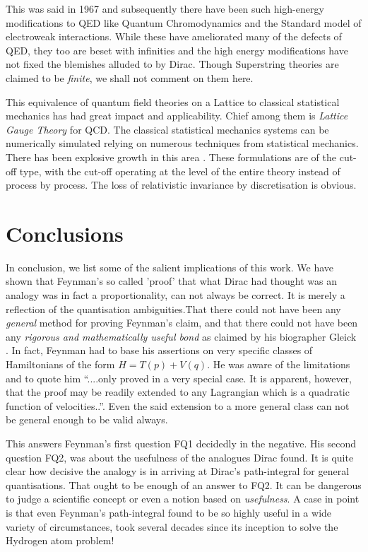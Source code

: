 \documentclass[12pt]{article}
\begin{document}
This was said in 1967 and subsequently there have been such high-energy modifications to QED like Quantum Chromodynamics and the Standard
model of electroweak interactions. While these have ameliorated many of the defects of QED, they too are beset with infinities and the
high energy modifications have not fixed the blemishes alluded to by Dirac. Though Superstring theories are claimed to be {\it finite}, we
shall not comment on them here.

This equivalence of quantum field theories on a Lattice to classical statistical mechanics has had great impact and applicability. Chief 
among them is
{\it Lattice Gauge Theory} \cite{seiler} for QCD. The classical statistical mechanics systems can be numerically simulated relying on numerous techniques
from statistical mechanics. There has been explosive growth in this area \cite{creutz}. These formulations are of the cut-off type, with
the cut-off operating at the level of the entire theory instead of process by process. The loss of relativistic invariance by discretisation
is obvious.
\section{Conclusions}
In conclusion, we list some of the salient implications of this work.  We have shown that Feynman's  so called 'proof' that what Dirac had
thought was an analogy was in fact a proportionality, can not always be correct. It is merely a reflection of the quantisation ambiguities.That 
there could not have been any {\it general} method for proving Feynman's claim, and that there could not have been any {\it rigorous 
and mathematically useful bond} as claimed by his biographer Gleick \cite{gleick}.
In fact, Feynman had to base his assertions on very specific classes of Hamiltonians of the form $H = T(p) + V(q)$. He was aware of the
limitations and to quote him ``....only proved in a very special case. It is apparent, however, that the proof may be readily extended to
any Lagrangian which is a quadratic function of velocities..''. Even the said extension to a more general class can not be general enough to
be valid always.

This answers Feynman's first question FQ1 decidedly in the negative. His second question FQ2, was about the usefulness
of the analogues Dirac found. It is quite clear how decisive the analogy is in arriving at Dirac's path-integral for general quantisations.
That ought to be enough of an answer to FQ2. It can be dangerous to judge a scientific concept or even a notion
based on {\it usefulness}. A case in point is that even Feynman's path-integral found to be so highly useful in a wide variety of circumstances,
took several decades since its inception to solve the Hydrogen atom problem! 
\end{document}
